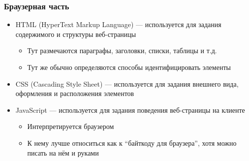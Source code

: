\documentclass[xetex,mathserif,serif]{beamer}
\begin{document}
    \begin{frame}
        \frametitle{Браузерная часть}
        \begin{itemize}
            \item HTML (HyperText Markup Language) --- используется для задания содержимого и структуры веб-страницы
            \begin{itemize}
                \item Тут размечаются параграфы, заголовки, списки, таблицы и т.д.
                \item Тут же обычно определяются способы идентифицировать элементы
            \end{itemize}
            \item CSS (Cascading Style Sheet) --- используется для задания внешнего вида, оформления и расположения элементов
            \item JavaScript --- используется для задания поведения веб-страницы на клиенте
            \begin{itemize}
                \item Интерпретируется браузером
                \item К нему лучше относиться как к ``байткоду для браузера'', хотя можно писать на нём и руками
            \end{itemize}
        \end{itemize}
    \end{frame}
\end{document}
